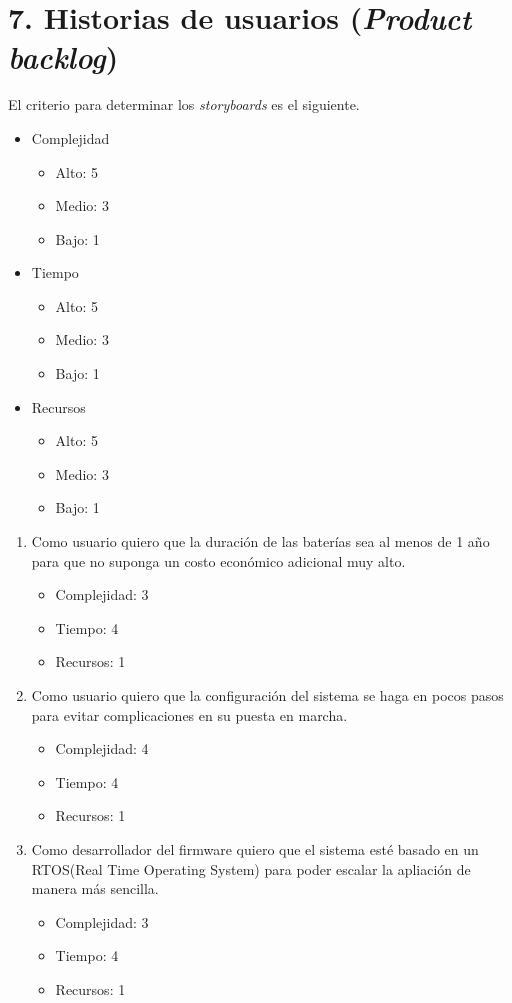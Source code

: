 \documentclass[
11pt, %
codirector, %
]{plan}
\begin{document}
\section{7. Historias de usuarios (\textit{Product backlog})}
\label{sec:backlog}

El criterio para determinar los \textit{storyboards} es el siguiente.

\begin{itemize}
	\item Complejidad
	\begin{itemize}
		\item Alto: 5
		\item Medio: 3
		\item Bajo: 1
	\end{itemize}
	\item Tiempo
	\begin{itemize}
		\item Alto: 5
		\item Medio: 3
		\item Bajo: 1
	\end{itemize}
	\item Recursos
	\begin{itemize}
		\item Alto: 5
		\item Medio: 3
		\item Bajo: 1
	\end{itemize}
\end{itemize}

\begin{enumerate}
	\item Como usuario quiero que la duración de las baterías sea al menos de 1 año para que no suponga un costo económico adicional muy alto.
	\begin{itemize}
		\item Complejidad: 3
		\item Tiempo: 4
		\item Recursos: 1 
	\end{itemize}
	\item Como usuario quiero que la configuración del sistema se haga en pocos pasos para evitar complicaciones en su puesta en marcha.
	\begin{itemize}
		\item Complejidad: 4
		\item Tiempo: 4
		\item Recursos: 1 
	\end{itemize}
	\item Como desarrollador del firmware quiero que el sistema esté basado en un RTOS(Real Time Operating System) para poder escalar la apliación de manera más sencilla.
	\begin{itemize}
		\item Complejidad: 3
		\item Tiempo: 4
		\item Recursos: 1 
	\end{itemize}
\end{enumerate}
\end{document}
